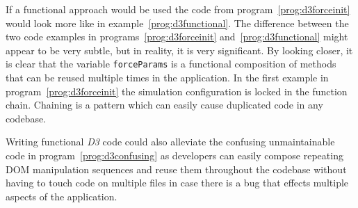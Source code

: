 If a functional approach would be used the code from program~\ref{prog:d3forceinit} would look more like in example~\ref{prog:d3functional}. The difference between the two code examples in programs~\ref{prog:d3forceinit} and~\ref{prog:d3functional} might appear to be very subtle, but in reality, it is very significant. By looking closer, it is clear that the variable \texttt{forceParams} is a functional composition of methods that can be reused multiple times in the application. In the first example in program~\ref{prog:d3forceinit} the simulation configuration is locked in the function chain. Chaining is a pattern which can easily cause duplicated code in any codebase. 

Writing functional \emph{D3} code could also alleviate the confusing unmaintainable code in program~\ref{prog:d3confusing} as developers can easily compose repeating DOM manipulation sequences and reuse them throughout the codebase without having to touch code on multiple files in case there is a bug that effects multiple aspects of the application.
